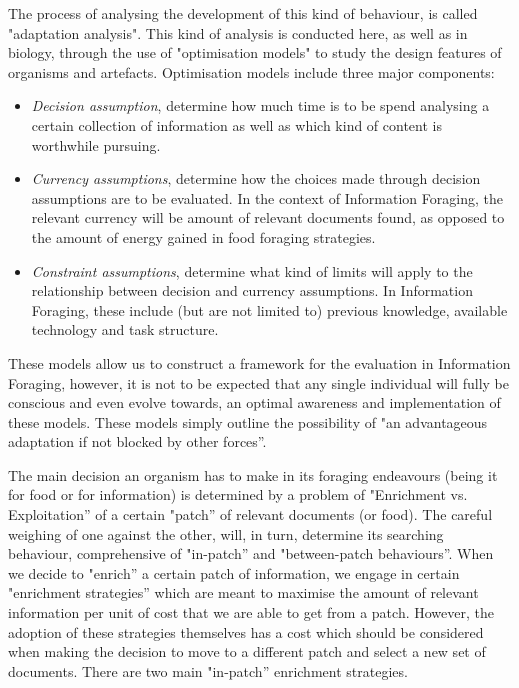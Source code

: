 \documentclass{mproj}
\begin{document}
The process of analysing the development of this kind of behaviour, is called "adaptation analysis". This kind of analysis is conducted here, as well as in biology, through the use of "optimisation models" to study the design features of organisms and artefacts. Optimisation models include three major components:

\begin{itemize}
	\item \textit{Decision assumption}, determine how much time is to be spend analysing a certain collection of information as well as which kind of content is worthwhile pursuing.
  	\item \textit{Currency assumptions}, determine how the choices made through decision assumptions are to be evaluated. In the context of Information Foraging, the relevant currency will be amount of relevant documents found, as opposed to the amount of energy gained in food foraging strategies.
  	\item \textit{Constraint assumptions}, determine what kind of limits will apply to the relationship between decision and currency assumptions. In Information Foraging, these include (but are not limited to) previous knowledge, available technology and task structure.
\end{itemize} 

These models allow us to construct a framework for the evaluation in Information Foraging, however, it is not to be expected that any single individual will fully be conscious and even evolve towards, an optimal awareness and implementation of these models. These models simply outline the possibility of "an advantageous adaptation if not blocked by other forces”. 

The main decision an organism has to make in its foraging endeavours (being it for food or for information) is determined by a problem of "Enrichment vs. Exploitation” of a certain "patch” of relevant documents (or food). The careful weighing of one against the other, will, in turn, determine its searching behaviour, comprehensive of "in-patch” and "between-patch behaviours”.  When we decide to "enrich” a certain patch of information, we engage in certain "enrichment strategies” which are meant to maximise the amount of relevant information per unit of cost that we are able to get from a patch. However, the adoption of these strategies themselves has a cost which should be considered when making the decision to move to a different patch and select a new set of documents. There are two main "in-patch” enrichment strategies. 
\end{document}

